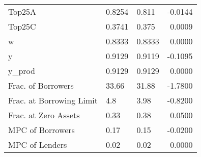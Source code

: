 \begin{table}
\begin{tabular}{lllr}
                  Top25A &  0.8254 &    0.811 & -0.0144 \\
                  Top25C &  0.3741 &    0.375 &  0.0009 \\
                       w &  0.8333 &   0.8333 &  0.0000 \\
                       y &  0.9129 &   0.9119 & -0.1095 \\
                  y\_prod &  0.9129 &   0.9129 &  0.0000 \\
      Frac. of Borrowers &   33.66 &    31.88 & -1.7800 \\
Frac. at Borrowing Limit &     4.8 &     3.98 & -0.8200 \\
    Frac. at Zero Assets &    0.33 &     0.38 &  0.0500 \\
        MPC of Borrowers &    0.17 &     0.15 & -0.0200 \\
          MPC of Lenders &    0.02 &     0.02 &  0.0000 \\
\bottomrule
\end{tabular}
\end{table}
